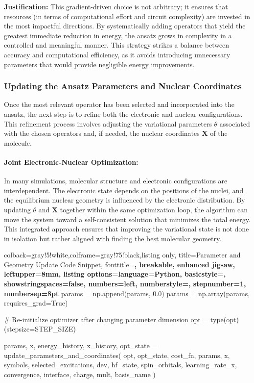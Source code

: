 \textbf{Justification:}  
This gradient-driven choice is not arbitrary; it ensures that resources (in terms of computational effort and circuit complexity) are invested in the most impactful directions. By systematically adding operators that yield the greatest immediate reduction in energy, the ansatz grows in complexity in a controlled and meaningful manner. This strategy strikes a balance between accuracy and computational efficiency, as it avoids introducing unnecessary parameters that would provide negligible energy improvements.

\subsubsection{Updating the Ansatz Parameters and Nuclear Coordinates}

Once the most relevant operator has been selected and incorporated into the ansatz, the next step is to refine both the electronic and nuclear configurations. This refinement process involves adjusting the variational parameters \(\theta\) associated with the chosen operators and, if needed, the nuclear coordinates \(\mathbf{X}\) of the molecule.

\paragraph{Joint Electronic-Nuclear Optimization:}  
In many simulations, molecular structure and electronic configurations are interdependent. The electronic state depends on the positions of the nuclei, and the equilibrium nuclear geometry is influenced by the electronic distribution. By updating \(\theta\) and \(\mathbf{X}\) together within the same optimization loop, the algorithm can move the system toward a self-consistent solution that minimizes the total energy. This integrated approach ensures that improving the variational state is not done in isolation but rather aligned with finding the best molecular geometry.

\begin{tcblisting}{colback=gray!5!white,colframe=gray!75!black,listing only,
    title=Parameter and Geometry Update Code Snippet, fonttitle=\bfseries, breakable, enhanced jigsaw, leftupper=8mm,
    listing options={language=Python, basicstyle=\ttfamily\small,
    showstringspaces=false, numbers=left, numberstyle=\footnotesize, stepnumber=1, numbersep=8pt}}
params = np.append(params, 0.0)
params = np.array(params, requires_grad=True)

# Re-initialize optimizer after changing parameter dimension
opt = type(opt)(stepsize=STEP_SIZE)

params, x, energy_history, x_history, opt_state = update_parameters_and_coordinates(
    opt, opt_state, cost_fn, params, x, symbols, selected_excitations, dev, hf_state, spin_orbitals,
    learning_rate_x, convergence, interface, charge, mult, basis_name
)
\end{tcblisting}


